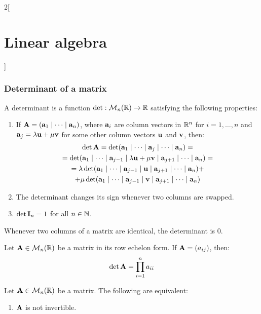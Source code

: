 \documentclass[../../../main.tex]{subfiles}
\begin{document}
\begin{multicols}{2}[\section{Linear algebra}]
  \subsubsection*{Determinant of a matrix}
  \begin{definition}[Determinant]
    A determinant is a function $\det:\mathcal{M}_n(\mathbb{R})\rightarrow\mathbb{R}$ satisfying the following properties:
    \begin{enumerate}
      \item If $\vb{A}=(\vb{a}_1\mid\cdots\mid \vb{a}_n)$, where $\vb{a}_i$ are column vectors in $\mathbb{R}^n$ for $i=1,\ldots,n$ and $\vb{a}_j=\lambda\vb{u}+\mu\vb{v}$ for some other column vectors $\vb{u}$ and $\vb{v}$, then:
            \begin{multline*}
              \det \vb{A}=\det(\vb{a}_1\mid\cdots\mid\vb{a}_j\mid\cdots\mid \vb{a}_n)=\\=\det(\vb{a}_1\mid\cdots\mid \vb{a}_{j-1}\mid\lambda \vb{u}+\mu \vb{v}\mid \vb{a}_{j+1}\mid\cdots\mid \vb{a}_n)=\\=\lambda\det(\vb{a}_1\mid\cdots\mid \vb{a}_{j-1}\mid \vb{u}\mid \vb{a}_{j+1}\mid\cdots\mid \vb{a}_n)+\\+\mu\det(\vb{a}_1\mid\cdots\mid \vb{a}_{j-1}\mid \vb{v}\mid \vb{a}_{j+1}\mid\cdots\mid \vb{a}_n)
            \end{multline*}
      \item The determinant changes its sign whenever two columns are swapped.
      \item $\det \vb{I}_n=1$ for all $n\in\mathbb{N}$.
    \end{enumerate}
  \end{definition}
  \begin{lemma}
    Whenever two columns of a matrix are identical, the determinant is 0.
  \end{lemma}
  \begin{prop}
    Let $\vb{A}\in\mathcal{M}_n(\mathbb{R})$ be a matrix in its row echelon form. If $\vb{A}=(a_{ij})$, then: $$\det\vb{A}=\prod_{i=1}^na_{ii}$$
  \end{prop}
  \begin{prop}
    Let $\vb{A}\in\mathcal{M}_n(\mathbb{R})$ be a matrix. The following are equivalent:
    \begin{enumerate}
      \item $\vb{A}$ is not invertible.

\end{enumerate}
\end{prop}
\end{multicols}
\end{document}
